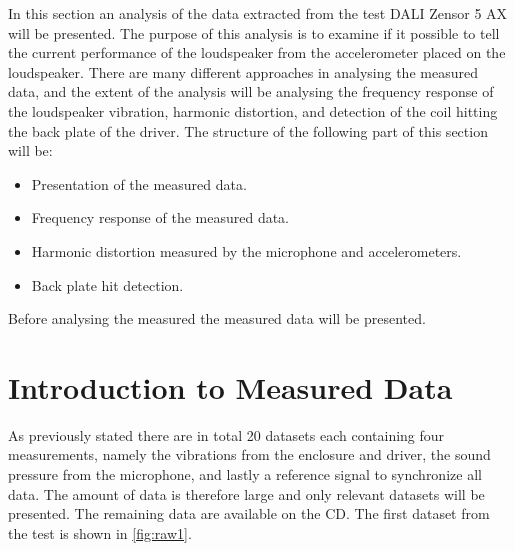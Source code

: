 In this section an analysis of the data extracted from the test DALI Zensor 5 AX will be presented. The purpose of this analysis is to examine if it possible to tell the current performance of the loudspeaker from the accelerometer placed on the loudspeaker. There are many different approaches in analysing the measured data, and the extent of the analysis will be analysing the frequency response of the loudspeaker vibration, harmonic distortion, and detection of the coil hitting the back plate of the driver. The structure of the following part of this section will be:

\begin{itemize}
\item Presentation of the measured data.
\item Frequency response of the measured data.
\item Harmonic distortion measured by the microphone and accelerometers.
\item Back plate hit detection.
\end{itemize}

Before analysing the measured the measured data will be presented.

\section{Introduction to Measured Data}

As previously stated there are in total 20 datasets each containing four measurements, namely the vibrations from the enclosure and driver, the sound pressure from the microphone, and lastly a reference signal to synchronize all data. The amount of data is therefore large and only relevant datasets will be presented. The remaining data are available on the CD. The first dataset from the test is shown in \autoref{fig:raw1}.

